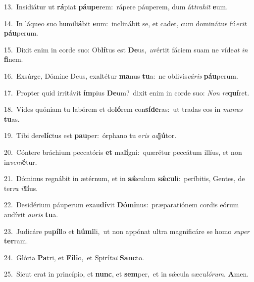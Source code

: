 {\numbfont\textcolor{\numbcolor}{13.}}~Insidiátur ut \textbf{rá}\-piat \textbf{páu}\-\textbf{pe}rem:~\star rápere páuperem, dum át\-\textit{tra}\-\textit{hit} \textbf{e}\-um.\par
{\numbfont\textcolor{\numbcolor}{14.}}~In láqueo suo humili\-\textbf{á}\-bit \textbf{e}\-um:~\star inclinábit se, et cadet, cum dominátus fú\-\textit{e}\-\textit{rit} \textbf{páu}\-perum.\par
{\numbfont\textcolor{\numbcolor}{15.}}~Dixit enim in corde suo: Ob\-\textbf{lí}\-tus est \textbf{De}\-us,~\star avértit fáciem suam ne víde\textit{at} \textit{in} \textbf{fi}\-nem.\par
{\numbfont\textcolor{\numbcolor}{16.}}~Exsúrge, Dómine Deus, exaltétur \textbf{ma}\-nus \textbf{tu}\-a:~\star ne oblivis\-\textit{cá}\-\textit{ris} \textbf{páu}\-perum.\par
{\numbfont\textcolor{\numbcolor}{17.}}~Propter quid irritávit \textbf{ím}\-pius \textbf{De}\-um?~\star dixit enim in corde suo: \textit{Non} \textit{re}\-\textbf{quí}ret.\par
{\numbfont\textcolor{\numbcolor}{18.}}~Vides quóniam tu labórem et do\-\textbf{ló}\-rem con\-\textbf{sí}\-\textbf{de}ras:~\star ut tradas eos in \textit{ma}\-\textit{nus} \textbf{tu}\-as.\par
{\numbfont\textcolor{\numbcolor}{19.}}~Tibi dere\-\textbf{líc}\-tus est \textbf{pau}\-per:~\star órphano tu e\textit{ris} \textit{ad}\-\textbf{jú}tor.\par
{\numbfont\textcolor{\numbcolor}{20.}}~Cóntere bráchium peccatóris \textbf{et} ma\-\textbf{lí}\-gni:~\star quærétur peccátum illíus, et non in\-\textit{ve}\-\textit{ni}\textbf{é}tur.\par
{\numbfont\textcolor{\numbcolor}{21.}}~Dóminus regnábit in ætérnum, et in \textbf{sǽ}\-culum \textbf{sǽ}\-\textbf{cu}li:~\star períbitis, Gentes, de ter\textit{ra} \textit{il}\-\textbf{lí}us.\par
{\numbfont\textcolor{\numbcolor}{22.}}~Desidérium páuperum exau\-\textbf{dí}\-vit \textbf{Dó}\-\textbf{mi}nus:~\star præparatiónem cordis eórum audívit \textit{au}\-\textit{ris} \textbf{tu}\-a.\par
{\numbfont\textcolor{\numbcolor}{23.}}~Judicáre pu\-\textbf{píl}\-lo et \textbf{hú}\-\textbf{mi}li,~\star ut non appónat ultra magnificáre se homo \textit{su}\-\textit{per} \textbf{ter}\-ram.\par
{\numbfont\textcolor{\numbcolor}{24.}}~Glória \textbf{Pa}\-tri, et \textbf{Fí}\-\textbf{li}o,~\star et Spirí\-\textit{tu}\-\textit{i} \textbf{Sanc}\-to.\par
{\numbfont\textcolor{\numbcolor}{25.}}~Sicut erat in princípio, et \textbf{nunc}\-, et \textbf{sem}\-per,~\star et in sǽcula sæcu\-\textit{ló}\-\textit{rum}. \textbf{A}\-men.\par
